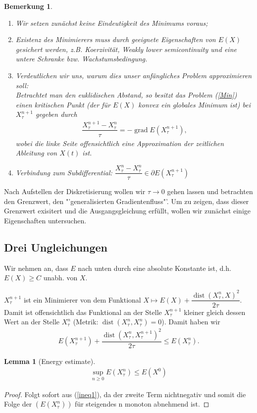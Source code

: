 \documentclass[11pt,a4paper,notitlepage]{scrreprt}
\newcommand{\dist}{\operatorname{dist}}
\newcommand{\grad}{\operatorname{grad}}
\newtheorem{lem}[defi]{Lemma}
\newtheorem{bem}[defi]{Bemerkung}
\begin{document}
\begin{bem}
\begin{enumerate}
\item Wir setzen zunächst keine Eindeutigkeit des Minimums voraus;
\item Existenz des Minimierers muss durch geeignete Eigenschaften von $E(X)$ gesichert werden, z.B. Koerzivität, Weakly lower semicontinuity und eine untere Schranke bzw. Wachstumsbedingung. 
\item Verdeutlichen wir uns, warum dies unser anfängliches Problem approximieren soll:\\
Betrachtet man den euklidischen Abstand, so besitzt das Problem (\ref{Min}) einen kritischen Punkt (der für $E(X)$ konvex ein globales Minimum ist) bei $X_\tau^{n+1}$ gegeben durch 
\begin{eqnarray*}
\dfrac{X_\tau^{n+1}-X_\tau^n}{\tau}=-\grad E(X_\tau^{n+1}),
\end{eqnarray*}
wobei die linke Seite offensichtlich eine Approximation der zeitlichen Ableitung von $X(t)$ ist.
\item Verbindung zum Subdifferential: $\dfrac{X_\tau^n-X_\tau^n}{\tau}\in\partial E(X_\tau^{n+1})$
\end{enumerate}
\end{bem}
\vspace{3pt}
Nach Aufstellen der Diskretisierung wollen wir $\tau \to 0$ gehen lassen und betrachten den Grenzwert, den "'generalisierten Gradientenfluss"'.
Um zu zeigen, dass dieser Grenzwert exisitert und die Ausgangsgleichung erfüllt, wollen wir zunächst einige Eigenschaften untersuchen. 

\subsection{Drei Ungleichungen}
Wir nehmen an, dass $E$ nach unten durch eine absolute Konstante ist, d.h. $E(X)\geq C$ unabh. von $X$.
\newline


$X_\tau^{n+1}$ ist ein Minimierer von dem Funktional $X \mapsto E(X)+\dfrac{\dist(X_\tau^n,X)^2}{2\tau}$. Damit ist offensichtlich das Funktional an der Stelle $X_\tau^{n+1}$ kleiner gleich dessen Wert an der Stelle $X_\tau^n$ (Metrik: $\dist(X_\tau^n,X_\tau^n)=0$). Damit haben wir
\begin{eqnarray}
E(X_\tau^{n+1})+\dfrac{\dist(X_\tau^n,X_\tau^{n+1})^2}{2\tau}\leq E(X_\tau^n). \label{ineq1}
\end{eqnarray} 
\begin{lem}[Energy estimate]
\begin{eqnarray}
\sup_{n\geq 0}E(X_\tau^n)\leq E(X^0) \label{enest}
\end{eqnarray}
\end{lem}
\begin{proof}
Folgt sofort aus (\ref{ineq1}), da der zweite Term nichtnegativ und somit die Folge der $(E(X_\tau^n))$ für steigendes n monoton abnehmend ist. 
\end{proof}
\end{document}
